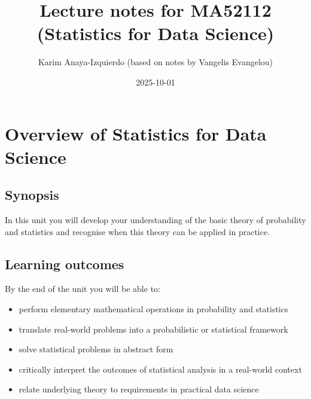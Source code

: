 \documentclass[
  letterpaper,
  DIV=11,
  numbers=noendperiod]{scrreport}
\title{Lecture notes for MA52112 (Statistics for Data Science)}
\author{Karim Anaya-Izquierdo (based on notes by Vangelis Evangelou)}
\date{2025-10-01}
\renewcommand*\contentsname{Table of contents}
\newcommand\contentsname{Table of contents}
\theoremstyle{definition}
\theoremstyle{plain}
\theoremstyle{plain}
\theoremstyle{definition}
\theoremstyle{remark}
\begin{document}
\maketitle

\renewcommand*\contentsname{Table of contents}
{
\hypersetup{linkcolor=}
\setcounter{tocdepth}{2}
\tableofcontents
}


\chapter*{Overview of Statistics for Data
Science}\label{overview-of-statistics-for-data-science}


\section*{Synopsis}\label{synopsis}


In this unit you will develop your understanding of the basic theory of
probability and statistics and recognise when this theory can be applied
in practice.

\section*{Learning outcomes}\label{learning-outcomes}


By the end of the unit you will be able to:

\begin{itemize}
\item
  perform elementary mathematical operations in probability and
  statistics
\item
  translate real-world problems into a probabilistic or statistical
  framework
\item
  solve statistical problems in abstract form
\item
  critically interpret the outcomes of statistical analysis in a
  real-world context
\item
  relate underlying theory to requirements in practical data science
\end{itemize}
\end{document}
